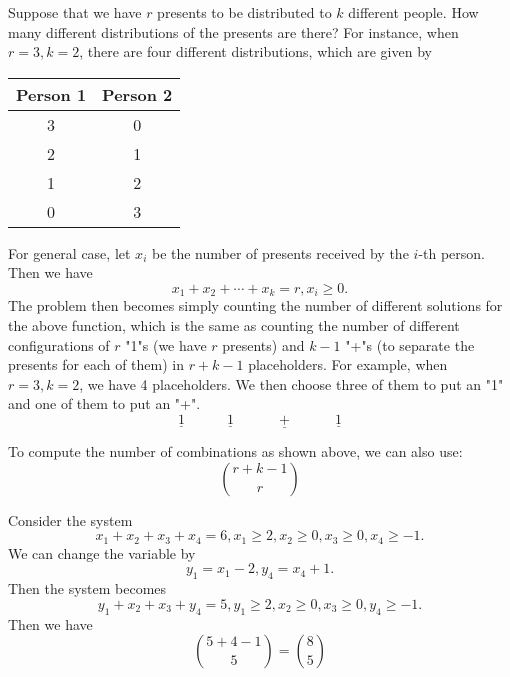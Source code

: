 \begin{eg}
    Suppose that we have \(r\) presents to be distributed to \(k\) different people. How many different distributions of the presents are there? For instance, when \(r = 3, k = 2\), there are four different distributions, which are given by
    \begin{table}[H]
        \centering
        \begin{tabular}{c|c}
                Person 1 & Person 2  \\
            \midrule
                3 & 0  \\
                2 & 1  \\
                1 & 2  \\
                0 & 3  \\
        \end{tabular}
    \end{table}
    For general case, let \(x_i\) be the number of presents received by the \(i\)-th person. Then we have
    \[
        x_1 + x_2 + \cdots + x_k = r, x_i \geq 0.
    \]
    The problem then becomes simply counting the number of different solutions for the above function, which is the same as counting the number of different configurations of \(r\) "1"s (we have \(r\) presents) and \(k-1\) "+"s (to separate the presents for each of them) in \(r + k - 1\) placeholders. For example, when \(r = 3, k = 2\), we have 4 placeholders. We then choose three of them to put an "1" and one of them to put an "+".
    \[
        \underline{\quad1\quad}\quad\underline{\quad1\quad}\quad\underline{\quad+\quad}\quad\underline{\quad1\quad}
    \]
\end{eg}
To compute the number of combinations as shown above, we can also use:
\[
    \binom{r + k - 1}{r}
\]
\begin{eg}
    Consider the system
    \[
        x_1 + x_2 + x_3 + x_4 = 6, x_1 \geq 2, x_2 \geq 0, x_3 \geq 0, x_4 \geq -1.
    \]
    We can change the variable by 
    \[
        y_1 = x_1 - 2, y_4 = x_4 + 1. 
    \]
    Then the system becomes
    \[
        y_1 + x_2 + x_3 + y_4 = 5, y_1 \geq 2, x_2 \geq 0, x_3 \geq 0, y_4 \geq -1.
    \]
    Then we have
    \[
        \binom{5 + 4 - 1}{5} = \binom{8}{5}
    \]
\end{eg}

